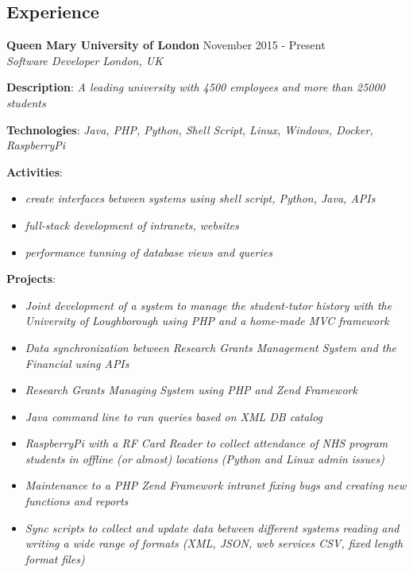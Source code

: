 \documentclass[margin]{res}
\begin{document}
\begin{resume}
\section{Experience}
  \textbf{Queen Mary University of London} \hfill {November 2015 - Present}\\
  \textit{Software Developer} \hfill \textit{London, UK}\\
  \begin{description}
    \item{\textbf{Description}: \textit{A leading university with 4500 employees and more than 25000 students}}
    \item{\textbf{Technologies}: \textit{Java, PHP, Python, Shell Script, Linux, Windows, Docker, RaspberryPi}}
    \item{
      \textbf{Activities}:
      \begin{itemize}
              \item{\textit{create interfaces between systems using shell script, Python, Java, APIs}}
              \item{\textit{full-stack development of intranets, websites}}
              \item{\textit{performance tunning of database views and queries}}
            \end{itemize}
    }
        \item{
      \textbf{Projects}:
      \begin{itemize}
              \item{\textit{Joint development of a system to manage the student-tutor history with the University of Loughborough using PHP and a home-made MVC framework}}
              \item{\textit{Data synchronization between Research Grants Management System and the Financial using APIs}}
              \item{\textit{Research Grants Managing System using PHP and Zend Framework}}
              \item{\textit{Java command line to run queries based on XML DB catalog}}
              \item{\textit{RaspberryPi with a RF Card Reader to collect attendance of NHS program students in offline (or almost) locations (Python and Linux       admin issues)}}
              \item{\textit{Maintenance to a PHP Zend Framework intranet fixing bugs and creating new functions and reports}}
              \item{\textit{Sync scripts to collect and update data between different systems reading and writing a wide range of formats (XML, JSON, web services      CSV, fixed length format files)}}

\end{itemize}}
\end{description}
\end{resume}
\end{document}
